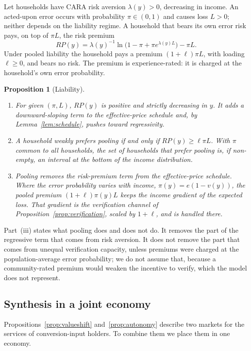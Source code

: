 \documentclass[12pt]{article}
\newtheorem{proposition}{Proposition}
\theoremstyle{remark}
\begin{document}
Let households have CARA risk aversion $\lambda(y)>0$, decreasing in income. An acted-upon error occurs with probability $\pi\in(0,1)$ and causes loss $L>0$; neither depends on the liability regime. A household that bears its own error risk pays, on top of $\pi L$, the risk premium
\[
RP(y)=\lambda(y)^{-1}\ln\!\big(1-\pi+\pi e^{\lambda(y)L}\big)-\pi L .
\]
Under pooled liability the household pays a premium $(1+\ell)\pi L$, with loading $\ell\ge0$, and bears no risk. The premium is experience-rated: it is charged at the household's own error probability.

\begin{proposition}[Liability]\label{prop:liability}
\begin{enumerate}[label=(\roman*),itemsep=0pt]
\item For given $(\pi,L)$, $RP(y)$ is positive and strictly decreasing in $y$. It adds a downward-sloping term to the effective-price schedule and, by Lemma~\ref{lem:schedule}, pushes toward regressivity.
\item A household weakly prefers pooling if and only if $RP(y)\ge\ell\pi L$. With $\pi$ common to all households, the set of households that prefer pooling is, if non-empty, an interval at the bottom of the income distribution.
\item Pooling removes the risk-premium term from the effective-price schedule. Where the error probability varies with income, $\pi(y)=e(1-v(y))$, the pooled premium $(1+\ell)\pi(y)L$ keeps the income gradient of the expected loss. That gradient is the verification channel of Proposition~\ref{prop:verification}, scaled by $1+\ell$, and is handled there.
\end{enumerate}
\end{proposition}

Part~(iii) states what pooling does and does not do. It removes the part of the regressive term that comes from risk aversion. It does not remove the part that comes from unequal verification capacity, unless premiums were charged at the population-average error probability; we do not assume that, because a community-rated premium would weaken the incentive to verify, which the model does not represent.

\subsection{Synthesis in a joint economy}\label{sec:synthesis}

Propositions~\ref{prop:valueshift} and~\ref{prop:autonomy} describe two markets for the services of conversion-input holders. To combine them we place them in one economy.
\end{document}
